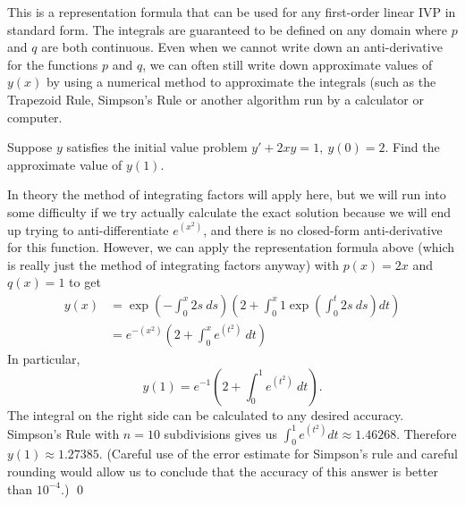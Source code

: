 {{\begin{center}
\end{center}



This is a representation formula that can be used for any first-order linear IVP in standard form.  The integrals are guaranteed to be defined on any domain where $p$ and $q$ are both continuous.  Even when we cannot write down an anti-derivative for the functions $p$ and $q$, we can often still write down approximate values of $y(x)$ by using a numerical method to approximate the integrals (such as the Trapezoid Rule, Simpson's Rule or another algorithm run by a calculator or computer.

\example Suppose $y$ satisfies the initial value problem $y'+2xy=1, \ y(0)=2$.  Find the approximate value of $y(1)$.

In theory the method of integrating factors will apply here, but we will run into some difficulty if we try actually calculate the exact solution because we will end up trying to anti-differentiate $e^{(x^2)}$, and there is no closed-form anti-derivative for this function.  However, we can apply the representation formula above (which is really just the method of integrating factors anyway) with $p(x)=2x$ and $q(x)=1$ to get
\begin{align*}
y(x) & = \exp \left( -\int_0^x 2s \ ds \right) \left( 2 + \int_0^x 1 \exp \left(\int_0^t 2s \ ds \right) dt \right) \\
& = e^{-(x^2)} \left( 2 + \int_0^x e^{(t^2)} \ dt \right)
\end{align*}
In particular,
\[ y(1) = e^{-1} \left( 2 + \int_0^1 e^{(t^2)} \ dt \right).\]
The integral on the right side can be calculated to any desired accuracy.  Simpson's Rule with $n=10$ subdivisions gives us $\int_0^1 e^{(t^2)} dt \approx 1.46268$.  Therefore $y(1) \approx 1.27385.$  (Careful use of the error estimate for Simpson's rule and careful rounding would allow us to conclude that the accuracy of this answer is better than  $10^{-4}$.)
\qed





}}
